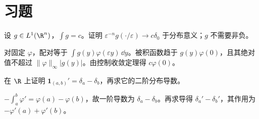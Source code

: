 \section{习题}
\begin{exercise}[质量与缩放]
设 $g\in L^1(\R^n)$，$\int g=c$。证明 $\varepsilon^{-n}g(\cdot/\varepsilon)\to c\delta_0$ 于分布意义；$g$ 不需要非负。
\end{exercise}
\begin{solution}
对固定 $\varphi$，配对等于 $\int g(y)\varphi(\varepsilon y)\,\dd y$。被积函数趋于 $g(y)\varphi(0)$，且其绝对值不超过 $\|\varphi\|_\infty|g(y)|$。由控制收敛定理得 $c\varphi(0)$。
\end{solution}
\begin{exercise}[边界质量]
在 $\R$ 上证明 $\mathbf1_{(a,b)}'=\delta_a-\delta_b$，再求它的二阶分布导数。
\end{exercise}
\begin{solution}
$-\int_a^b\varphi'=\varphi(a)-\varphi(b)$，故一阶导数为 $\delta_a-\delta_b$。再求导得 $\delta_a'-\delta_b'$，其作用为 $-\varphi'(a)+\varphi'(b)$。
\end{solution}
